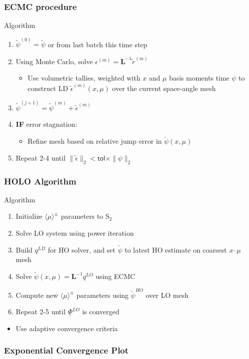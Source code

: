 \documentclass[xcolor=dvipsnames,handout,unknownkeysallowed]{beamer}
\newlength{\wideitemsep}
\let\olditem\item
\renewcommand{\item}{\setlength{\itemsep}{\wideitemsep}\olditem}
\newcommand{\B}[1]{\ensuremath{\mathbf{#1}}}
\newcommand{\mom}[1]{\langle #1 \rangle}
\begin{document}
\begin{frame}
    \frametitle{ECMC procedure}
    {
    \begin{block}{Algorithm}
    \begin{enumerate}
        \item $\tilde \psi^{(0)}=\tilde \psi$ or from last batch this time step
        \item Using Monte Carlo, solve $\epsilon^{(m)} = \B L^{-1} \tilde r^{(m)}$
            \begin{itemize}
                \item Use volumetric tallies, weighted with $x$ and $\mu$ basis moments time $\psi$ to construct LD
                    $\tilde\epsilon^{(m)}(x,\mu)$ over the current space-angle mesh
            \end{itemize}
        \item $\tilde \psi^{(j+1)} = \tilde \psi^{(m)} + \tilde \epsilon^{(m)}$
        \item \textbf{IF} error stagnation:
            \begin{itemize}
                \item Refine mesh based on relative jump error in $\tilde \psi(x,\mu)$
            \end{itemize}
        \item Repeat 2-4 until $\| \tilde \epsilon \|_2 < \textsf{tol}\times
            \|\psi\|_2$
    \end{enumerate}
    \end{block}
}
\end{frame}

\begin{frame}
    \frametitle{HOLO Algorithm}
    {
    \begin{block}{Algorithm}
        \begin{enumerate}
            \item Initialize $\mom{\mu}^{\pm}$ parameters to S$_2$
            \item Solve LO system using power iteration
            \item Build $q^{LD}$ for HO solver, and set $\tilde{\psi}$ to latest
                HO estimate
                on coarsest $x$--$\mu$ mesh
            \item Solve $\tilde \psi(x,\mu) = \B L^{-1}q^{LO}$ using ECMC
            \item Compute new $\mom{\mu}^\pm$ parameters using $\tilde \psi^{HO}$ over LO mesh
            \item Repeat 2-5 until $\underline \Phi^{LO}$ is converged
        \end{enumerate}

    \begin{itemize}
        \item Use adaptive convergence criteria
    \end{itemize}
    \end{block}
}
\end{frame}

\begin{frame}
    \frametitle{Exponential Convergence Plot}






\end{frame}
\end{document}
